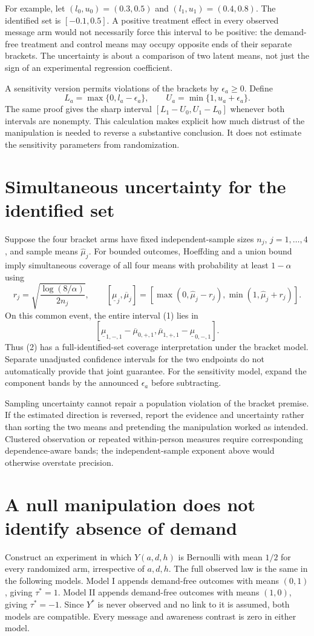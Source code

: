 \documentclass[11pt]{article}
\begin{document}
For example, let $(l_0,u_0)=(0.3,0.5)$ and $(l_1,u_1)=(0.4,0.8)$. The identified set is $[-0.1,0.5]$. A positive treatment effect in every observed message arm would not necessarily force this interval to be positive: the demand-free treatment and control means may occupy opposite ends of their separate brackets. The uncertainty is about a comparison of two latent means, not just the sign of an experimental regression coefficient.

A sensitivity version permits violations of the brackets by $\epsilon_a\geq0$. Define
\[
 L_a=\max\{0,l_a-\epsilon_a\},\qquad
 U_a=\min\{1,u_a+\epsilon_a\}.
\]
The same proof gives the sharp interval $[L_1-U_0,U_1-L_0]$ whenever both intervals are nonempty. This calculation makes explicit how much distrust of the manipulation is needed to reverse a substantive conclusion. It does not estimate the sensitivity parameters from randomization.

\section{Simultaneous uncertainty for the identified set}
Suppose the four bracket arms have fixed independent-sample sizes $n_j$, $j=1,\ldots,4$, and sample means $\widehat\mu_j$. For bounded outcomes, Hoeffding and a union bound imply simultaneous coverage of all four means with probability at least $1-\alpha$ using
\[
 r_j=\sqrt{\frac{\log(8/\alpha)}{2n_j}},\qquad
 [\underline\mu_j,\overline\mu_j]
 =[\max(0,\widehat\mu_j-r_j),\min(1,\widehat\mu_j+r_j)].
\]
On this common event, the entire interval (1) lies in
\[
 [\underline\mu_{1,-,1}-\overline\mu_{0,+,1},
   \overline\mu_{1,+,1}-\underline\mu_{0,-,1}]. \tag{2}
\]
Thus (2) has a full-identified-set coverage interpretation under the bracket model. Separate unadjusted confidence intervals for the two endpoints do not automatically provide that joint guarantee. For the sensitivity model, expand the component bands by the announced $\epsilon_a$ before subtracting.

Sampling uncertainty cannot repair a population violation of the bracket premise. If the estimated direction is reversed, report the evidence and uncertainty rather than sorting the two means and pretending the manipulation worked as intended. Clustered observation or repeated within-person measures require corresponding dependence-aware bands; the independent-sample exponent above would otherwise overstate precision.

\section{A null manipulation does not identify absence of demand}
Construct an experiment in which $Y(a,d,h)$ is Bernoulli with mean $1/2$ for every randomized arm, irrespective of $a,d,h$. The full observed law is the same in the following models. Model I appends demand-free outcomes with means $(0,1)$, giving $\tau^*=1$. Model II appends demand-free outcomes with means $(1,0)$, giving $\tau^*=-1$. Since $Y^*$ is never observed and no link to it is assumed, both models are compatible. Every message and awareness contrast is zero in either model.
\end{document}
